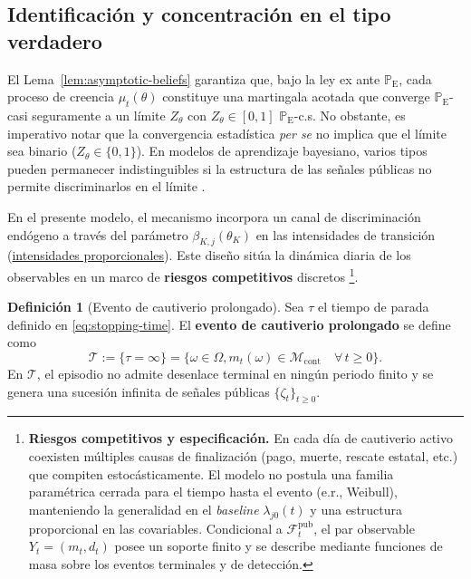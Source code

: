 \documentclass[12pt]{article}
\providecommand{\textcite}{\citet}
\theoremstyle{definition}
\newtheorem{definition}[theorem]{Definición}
\theoremstyle{remark}
\newcommand{\ProbE}{\mathbb{P}_{\mathrm{E}}}
\newcommand{\1}{\mathbf{1}}
\begin{document}
\subsection{Identificación y concentración en el tipo verdadero}
\label{subsec:identificacion-concentracion-tipo}

El Lema~\ref{lem:asymptotic-beliefs} garantiza que, bajo la ley ex ante $\ProbE$, cada proceso de creencia $\mu_t(\theta)$ constituye una martingala acotada que converge $\ProbE$-casi seguramente a un límite $Z_\theta$ con $Z_\theta\in[0,1]$ $\ProbE$-c.s. No obstante, es imperativo notar que la convergencia estadística \textit{per se} no implica que el límite sea binario ($Z_\theta \in \{0,1\}$). En modelos de aprendizaje bayesiano, varios tipos pueden permanecer indistinguibles si la estructura de las señales públicas no permite discriminarlos en el límite \textcite{Schervish1995Theory}.


En el presente modelo, el mecanismo incorpora un canal de discriminación endógeno a través del parámetro $\beta_{K,j}(\theta_K)$ en las intensidades de transición (\hyperref[subsec:intensidades-prop]{intensidades proporcionales}). Este diseño sitúa la dinámica diaria de los observables en un marco de \textbf{riesgos competitivos} discretos \textcite{Cox1972,Bradburn2003}\footnote{%
\textbf{Riesgos competitivos y especificación.} En cada día de cautiverio activo coexisten múltiples causas de finalización (pago, muerte, rescate estatal, etc.) que compiten estocásticamente. El modelo no postula una familia paramétrica cerrada para el tiempo hasta el evento (e.r., Weibull), manteniendo la generalidad en el \textit{baseline} $\lambda_{j0}(t)$ y una estructura proporcional en las covariables. Condicional a $\mathcal{F}_t^{\mathrm{pub}}$, el par observable $Y_t=(m_t,d_t)$ posee un soporte finito y se describe mediante funciones de masa sobre los eventos terminales y de detección.}.


\begin{definition}[Evento de cautiverio prolongado]
\label{def:event-T-long}
Sea $\tau$ el tiempo de parada definido en \eqref{eq:stopping-time}. El \textbf{evento de cautiverio prolongado} se define como
\begin{equation*}
\mathcal{T}:=\{\tau=\infty\}=\bigl\{ \omega\in\Omega , m_t(\omega)\in\mathcal{M}_{\mathrm{cont}} \quad \forall\, t\ge 0 \bigr\}.
\end{equation*}
En $\mathcal{T}$, el episodio no admite desenlace terminal en ningún periodo finito y se genera una sucesión infinita de señales públicas $\{\zeta_t\}_{t\ge 0}$.
\end{definition}
\end{document}
